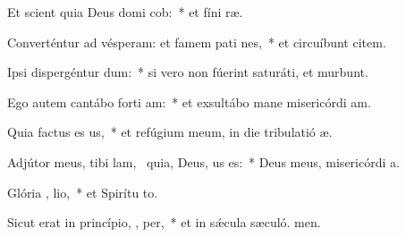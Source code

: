 \item Et scient quia Deus domi cob:~* et fíni ræ.
\item Converténtur ad vésperam: et famem pati  nes,~* et circuíbunt citem.
\item Ipsi dispergéntur  dum:~* si vero non fúerint saturáti, et murbunt.
\item Ego autem cantábo forti am:~* et exsultábo mane misericórdi am.
\item Quia factus es  us,~* et refúgium meum, in die tribulatió æ.
\item Adjútor meus, tibi lam,~\pscross{} quia, Deus,  us es:~* Deus meus, misericórdi a.
\item Glória ,  lio,~* et Spirítu to.
\item Sicut erat in princípio,  ,  per,~* et in sǽcula sæculó. men.
